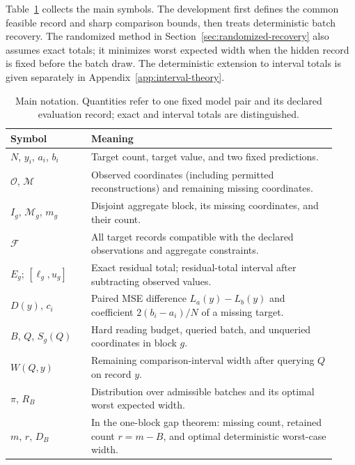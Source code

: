 \documentclass[12pt]{article}
\newcommand{\F}{\mathcal{F}}
\newcommand{\M}{\mathcal{M}}
\newcommand{\Oset}{\mathcal{O}}
\begin{document}
Table~\ref{tab:notation} collects the main symbols. The development first
defines the common feasible record and sharp comparison bounds, then treats
deterministic batch recovery. The randomized method in
Section~\ref{sec:randomized-recovery} also assumes exact totals; it minimizes
worst expected width when the hidden record is fixed before the batch draw.
The deterministic extension to interval totals is given separately in
Appendix~\ref{app:interval-theory}.

\begin{table}[htbp]\centering\small
\caption{Main notation. Quantities refer to one fixed model pair and its
declared evaluation record; exact and interval totals are distinguished.}
\label{tab:notation}
\begin{tabular}{p{0.23\linewidth}p{0.70\linewidth}}\toprule
Symbol & Meaning\\\midrule
$N$, $y_i$, $a_i$, $b_i$ & Target count, target value, and two fixed predictions.\\
$\Oset$, $\M$ & Observed coordinates (including permitted reconstructions) and remaining missing coordinates.\\
$I_g$, $\M_g$, $m_g$ & Disjoint aggregate block, its missing coordinates, and their count.\\
$\F$ & All target records compatible with the declared observations and aggregate constraints.\\
$E_g$; $[\ell_g,u_g]$ & Exact residual total; residual-total interval after subtracting observed values.\\
$D(y)$, $c_i$ & Paired MSE difference $L_a(y)-L_b(y)$ and coefficient $2(b_i-a_i)/N$ of a missing target.\\
$B$, $Q$, $S_g(Q)$ & Hard reading budget, queried batch, and unqueried coordinates in block $g$.\\
$W(Q,y)$ & Remaining comparison-interval width after querying $Q$ on record $y$.\\
$\pi$, $R_B$ & Distribution over admissible batches and its optimal worst expected width.\\
$m$, $r$, $D_B$ & In the one-block gap theorem: missing count, retained count $r=m-B$, and optimal deterministic worst-case width.\\
\bottomrule\end{tabular}
\end{table}
\end{document}
